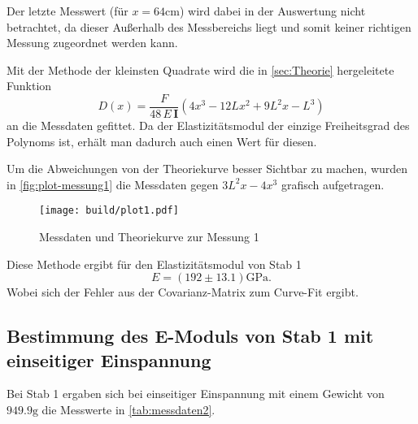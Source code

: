Der letzte Messwert (für $x = 64\si{\centi\meter}$) wird dabei in der Auswertung nicht
betrachtet, da dieser Außerhalb des Messbereichs liegt und somit keiner richtigen Messung 
zugeordnet werden kann.

Mit der Methode der kleinsten Quadrate wird die in \autoref{sec:Theorie} hergeleitete
Funktion 
\begin{equation}
	D(x) = \frac{F}{48 \, E \, \mathbf{I}} \left(4x^3 - 12Lx^2 + 9L^2x - L^3 \right)
\end{equation}
an die Messdaten gefittet. Da der Elastizitätsmodul der einzige
Freiheitsgrad des Polynoms ist, erhält man dadurch auch einen Wert für diesen.

Um die Abweichungen von der Theoriekurve besser Sichtbar zu machen, 
wurden in \autoref{fig:plot-messung1} die Messdaten gegen $3L^2x - 4x^3$ grafisch 
aufgetragen.
\begin{figure}[H]
	\centering
	\texttt{[image: build/plot1.pdf]}
	\caption{Messdaten und Theoriekurve zur Messung 1}
	\label{fig:plot-messung1}
\end{figure}

Diese Methode ergibt für den Elastizitätsmodul von Stab 1
\begin{equation}
	E = (192 \pm 13.1) \si{\giga\pascal}.
	\label{eqn:E-messung1}
\end{equation}
Wobei sich der Fehler aus der Covarianz-Matrix zum Curve-Fit ergibt.

\subsection{Bestimmung des E-Moduls von Stab 1 mit einseitiger Einspannung}
\label{sec:messung2}

Bei Stab 1 ergaben sich bei einseitiger Einspannung 
mit einem Gewicht von $949.9 \si{\gram}$ 
die Messwerte in \autoref{tab:messdaten2}.

